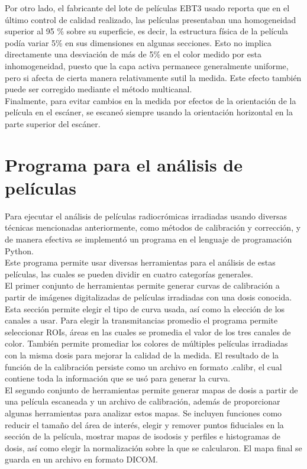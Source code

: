 Por otro lado, el fabricante del lote de películas EBT3 usado reporta que en el último control de calidad realizado, las películas presentaban una homogeneidad superior al 95 \% sobre su superficie, es decir, la estructura física de la película podía variar 5\% en sus dimensiones en algunas secciones. Esto no implica directamente una desviación de más de 5\% en el color medido por esta inhomogeneidad, puesto que la capa activa permanece generalmente uniforme, pero si afecta de cierta manera relativamente sutil la medida. Este efecto también puede ser corregido mediante el método multicanal. \\ 



Finalmente, para evitar cambios en la medida por efectos de la orientación de la película en el escáner, se escaneó siempre usando la orientación horizontal en la parte superior del escáner.\\

\section{Programa para el análisis de películas}

Para ejecutar el análisis de películas radiocrómicas irradiadas usando diversas técnicas mencionadas anteriormente, como métodos de calibración y corrección, y de manera efectiva se implementó un programa en el lenguaje de programación Python. \\

Este programa permite usar diversas herramientas para el análisis de estas películas, las cuales se pueden dividir en cuatro categorías generales.\\

El primer conjunto de herramientas permite generar curvas de calibración a partir de imágenes digitalizadas de películas irradiadas con una dosis conocida. Esta sección permite elegir el tipo de curva usada, así como la elección de los canales a usar. Para elegir la transmitancias promedio el programa permite seleccionar ROIs, áreas en las cuales se promedia el valor de los tres canales de color. También permite promediar los colores de múltiples películas irradiadas con la misma dosis para mejorar la calidad de la medida. El resultado de la función de la calibración persiste como un archivo en formato .calibr, el cual contiene toda la información que se usó para generar la curva.\\

El segundo conjunto de herramientas permite generar mapas de dosis a partir de una película escaneada y un archivo de calibración, además de proporcionar algunas herramientas para analizar estos mapas. Se incluyen funciones como reducir el tamaño del área de interés, elegir y remover puntos fiduciales en la sección de la película, mostrar mapas de isodosis y perfiles e histogramas de dosis, así como elegir la normalización sobre la que se calcularon. El mapa final se guarda en  un archivo en formato DICOM.\\

